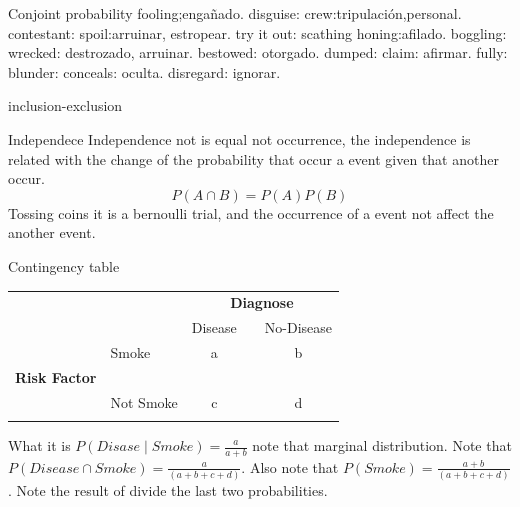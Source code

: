 \documentclass{beamer}
\begin{document}
\begin{frame}{Conjoint probability}
fooling;engañado.
disguise:
crew:tripulación,personal.
contestant:
spoil:arruinar, estropear.
try it out:
scathing
honing:afilado.
boggling:
wrecked: destrozado, arruinar.
bestowed: otorgado.
dumped:
claim: afirmar.
fully:
blunder:
conceals: oculta.
disregard: ignorar.
\end{frame}




\begin{frame}{inclusion-exclusion}

\end{frame}



\begin{frame}{Independece}
Independence not is equal not occurrence, the independence is related with the change of the probability that occur a event given that another occur.
\begin{equation}
P(A \cap B) = P(A)P(B)
\end{equation}
Tossing coins it is a bernoulli trial, and the occurrence of a event not affect the another event.
\end{frame}



\begin{frame}{Contingency table}
\begin{table}[]
\begin{tabular}{lllccc}          &                               &                                & \multicolumn{3}{c}{\textbf{Diagnose}}                                               \\ \cline{4-6} 
          &                               &                                & \multicolumn{1}{l}{Disease} & \multicolumn{1}{l}{} & \multicolumn{1}{l}{No-Disease} \\ \cline{4-6} 
          & \multicolumn{1}{l|}{}         & \multicolumn{1}{l|}{Smoke}     & a                           &                      & b                              \\
\multicolumn{2}{l|}{\textbf{Risk Factor}} & \multicolumn{1}{l|}{}          &                             &                      &                                \\
          & \multicolumn{1}{l|}{}         & \multicolumn{1}{l|}{Not Smoke} & c                           &                      & d                              \\
          &                               &                                & \multicolumn{1}{l}{}        & \multicolumn{1}{l}{} & \multicolumn{1}{l}{}          
\end{tabular}
\end{table}
What it is $P(Disase \mid Smoke) = \frac{a}{a+b}$ 
note that marginal distribution.  Note that $P(Disease \cap Smoke) = \frac{a}{(a+b+c+d)}$. Also note that $P(Smoke)= \frac{a+b}{(a+b+c+d)}$. Note the result of divide the last two probabilities.
\end{frame}
\end{document}
